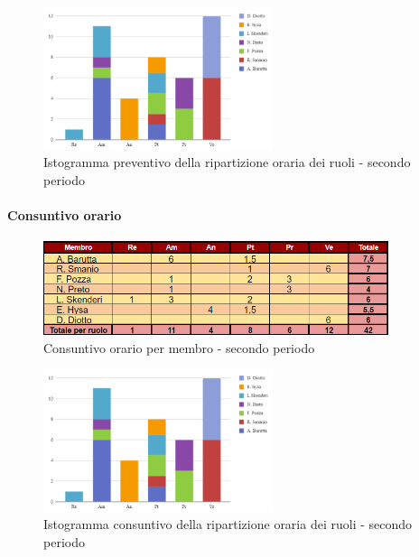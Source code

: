 \vspace{0.6cm}

\begin{figure}[H]
    \centering
    \includegraphics[width=0.6\textwidth]{../Images/preventivoDivisioneRuoli2Periodo.png}
    \caption{Istogramma preventivo della ripartizione oraria dei ruoli - secondo periodo}
    \label{fig:Preventivo_ripartizione_oraria_2}
\end{figure}

\paragraph{Consuntivo orario } 

\begin{figure}[H]
    \centering
    \includegraphics[width=0.9\textwidth]{../Images/consuntivoOrario2Periodo.png}
    \caption{Consuntivo orario per membro - secondo periodo}
    \label{fig:Constuntivo_orario_2}
\end{figure}

\vspace{0.6cm}

\begin{figure}[H]
    \centering
    \includegraphics[width=0.6\textwidth]{../Images/consuntivoDivisioneRuoli2Periodo.png}
    \caption{Istogramma consuntivo della ripartizione oraria dei ruoli - secondo periodo}
    \label{fig:Consuntivo_ripartizione_oraria_2}
\end{figure}


